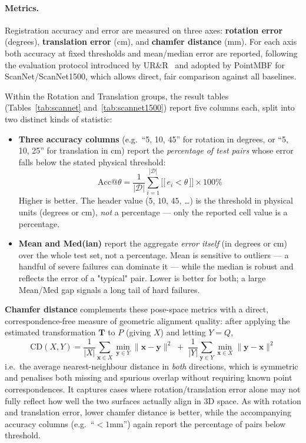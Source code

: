 \documentclass[11pt,a4paper]{article}
\begin{document}
\paragraph{Metrics.}
Registration accuracy and error are measured on three axes:
\textbf{rotation error} (degrees), \textbf{translation error} (cm), and
\textbf{chamfer distance} (mm). For each axis both accuracy at fixed thresholds and
mean/median error are reported, following the evaluation protocol introduced by
UR\&R~\cite{elbanani2021urr} and adopted by PointMBF for ScanNet/ScanNet1500, which
allows direct, fair comparison against all baselines.

Within the Rotation and Translation groups, the result tables (Tables~\ref{tab:scannet}
and~\ref{tab:scannet1500}) report five columns each, split into two distinct kinds of
statistic:

\begin{itemize}[noitemsep]
  \item \textbf{Three accuracy columns} (e.g.\ ``5, 10, 45'' for rotation in degrees, or
    ``5, 10, 25'' for translation in cm) report the \emph{percentage of test pairs} whose
    error falls below the stated physical threshold:
    \begin{equation}
      \mathrm{Acc@}\theta = \frac{1}{|\mathcal{D}|}\sum_{i=1}^{|\mathcal{D}|}
      \bigl[\!\bigl[\, e_i < \theta \,\bigr]\!\bigr] \times 100\%
      \tag{22}
    \end{equation}
    Higher is better. The header value ($5$, $10$, $45$, \ldots) is the threshold in
    physical units (degrees or cm), \emph{not} a percentage — only the reported cell
    value is a percentage.
  \item \textbf{Mean and Med(ian)} report the aggregate \emph{error itself} (in degrees
    or cm) over the whole test set, not a percentage. Mean is sensitive to outliers — a
    handful of severe failures can dominate it — while the median is robust and reflects
    the error of a "typical" pair. Lower is better for both; a large Mean/Med gap signals
    a long tail of hard failures.
\end{itemize}

\textbf{Chamfer distance} complements these pose-space metrics with a direct,
correspondence-free measure of geometric alignment quality: after applying the estimated
transformation $\mathbf{T}$ to $P$ (giving $X$) and letting $Y=Q$,
\begin{equation}
  \mathrm{CD}(X,Y) = \frac{1}{|X|}\sum_{\mathbf{x}\in X}\min_{\mathbf{y}\in Y}
  \lVert \mathbf{x}-\mathbf{y}\rVert^2 \;+\;
  \frac{1}{|Y|}\sum_{\mathbf{y}\in Y}\min_{\mathbf{x}\in X}\lVert \mathbf{y}-\mathbf{x}\rVert^2
  \tag{23}
\end{equation}
i.e.\ the average nearest-neighbour distance in \emph{both} directions, which is
symmetric and penalises both missing and spurious overlap without requiring known point
correspondences. It captures cases where rotation/translation error alone may not fully
reflect how well the two surfaces actually align in 3D space. As with rotation and
translation error, lower chamfer distance is better, while the accompanying accuracy
columns (e.g.\ ``$<1$mm'') again report the percentage of pairs below threshold.
\end{document}
